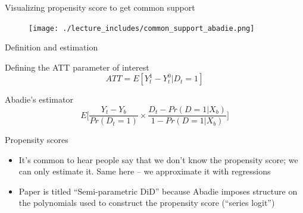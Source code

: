 \documentclass{beamer}
\begin{document}
\begin{frame}{Visualizing propensity score to get common support}

	\begin{figure}
	\texttt{[image: ./lecture\_includes/common\_support\_abadie.png]}
	\end{figure}

\end{frame}

\begin{frame}{Definition and estimation}

Defining the ATT parameter of interest
\begin{equation}
ATT=E[Y^1_t - Y^0_t |D_t=1]
\end{equation}

\bigskip
Abadie's estimator
\begin{equation}
E\bigg [ \frac{Y_t - Y_b}{Pr(D_t=1)} \times \frac{D_t - Pr(D=1|X_b)}{1-Pr(D=1|X_b)} \bigg ]
\end{equation}


\end{frame}


\begin{frame}{Propensity scores}

\begin{itemize}
\item It's common to hear people say that we don't know the propensity score; we can only estimate it. Same here -- we approximate it with regressions
\item Paper is titled ``Semi-parametric DiD'' because Abadie imposes structure on the polynomials used to construct the propensity score (``series logit'')
\end{itemize}

\end{frame}
\end{document}
